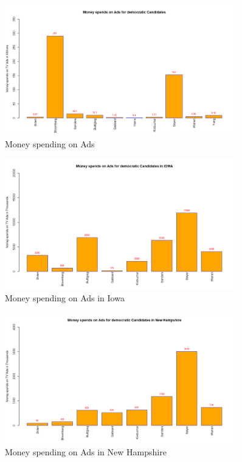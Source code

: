 \begin{figure}[H]
    \centering
    \includegraphics[width=0.9\textwidth]{figures/MoneyspendinAds.png}
    \caption{Money spending on Ads}
    \label{MoneyspendinAds}
\end{figure}

\begin{figure}[H]
    \centering
    \includegraphics[width=0.9\textwidth]{figures/IOWA.png}
    \caption{Money spending on Ads in Iowa}
    \label{IOWA}
\end{figure}

\begin{figure}[H]
    \centering
    \includegraphics[width=0.9\textwidth]{figures/Newhampshire.png}
    \caption{Money spending on Ads in New Hampshire}
    \label{Newhampshire}
\end{figure}

